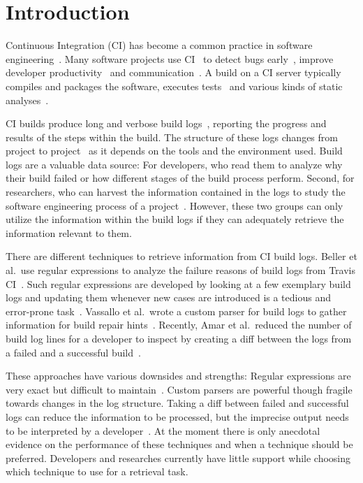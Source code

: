 \documentclass[\myrootdir/main.tex]{subfiles}
\begin{document}
\chapter{Introduction}
Continuous Integration (CI) has become a common practice in software engineering~\cite{hilton2016usage}.
Many software projects use CI~\cite{hilton2016usage,staahl2014modeling,beller2017oops} to detect bugs early~\cite{vasilescu2015quality,duvall2007continuous}, improve developer productivity~\cite{miller2008hundred,hilton2016usage} and communication~\cite{downs2012ambient}.
A build on a CI server typically compiles and packages the software, executes tests~\cite{beller2017oops} and various kinds of static analyses~\cite{zampetti2017open}.

CI builds produce long and verbose build logs~\cite{beller2017oops}, reporting the progress and results of the steps within the build.
The structure of these logs changes from project to project~\cite{staahl2014modeling} as it depends on the tools and the environment used.
Build logs are a valuable data source: For developers, who read them to analyze why their build failed or how different stages of the build process perform.
Second, for researchers, who can harvest the information contained in the logs to study the software engineering process of a project~\cite{rausch2017empirical,beller2017oops,seo2014programmers,vassallo2017a-tale}.
However, these two groups can only utilize the information within the build logs if they can adequately retrieve the information relevant to them.

There are different techniques to retrieve information from CI build logs. Beller et al.\ use regular expressions to analyze the failure reasons of build logs from Travis CI~\cite{beller2017oops}.
Such regular expressions are developed by looking at a few exemplary build logs and updating them whenever new cases are introduced is a tedious and error-prone task~\cite{michael2019regexes}.
Vassallo et al.\ wrote a custom parser for build logs to gather information for build repair hints~\cite{vassallo2018un-break}.
Recently, Amar et al.\ reduced the number of build log lines for a developer to inspect by creating a diff between the logs from a failed and a successful build~\cite{amar2019mining}.

These approaches have various downsides and strengths:
Regular expressions are very exact but difficult to maintain~\cite{michael2019regexes}.
Custom parsers are powerful though fragile towards changes in the log structure.
Taking a diff between failed and successful logs can reduce the information to be processed, but the imprecise output needs to be interpreted by a developer~\cite{amar2019mining}.
At the moment there is only anecdotal evidence on the performance of these techniques and when a technique should be preferred.
Developers and researches currently have little support while choosing which technique to use for a retrieval task.
\end{document}
